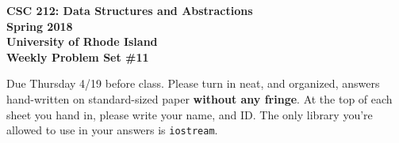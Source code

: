 \documentclass[11pt]{article}
\begin{document}
\thispagestyle{empty}

\begin{center}
    {\Large\bf CSC 212: Data Structures and Abstractions}\\
    \medskip
    {\Large\bf Spring 2018}\\
    \medskip
    {\Large\bf University of Rhode Island}\\
    \bigskip
    {\Large\bf Weekly Problem Set \#11}
\end{center}

Due Thursday 4/19 before class. Please turn in neat, and organized, answers hand-written on standard-sized paper \textbf{without any fringe}. At the top of each sheet you hand in, please write your name, and ID.
The only library you're allowed to use in your answers is \verb|iostream|.
\end{document}
